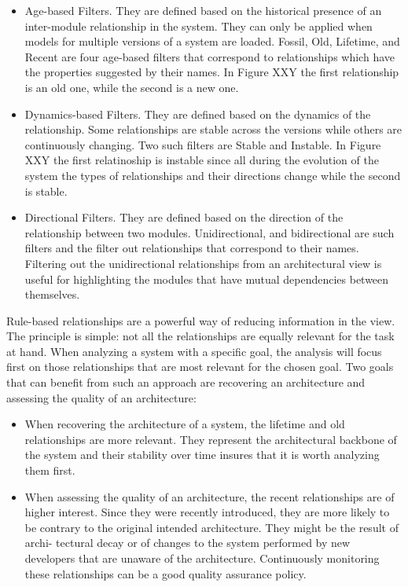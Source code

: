 \documentclass[preprint,12pt]{elsarticle}
\begin{document}
\begin{itemize}
\item Age-based Filters. They are defined based on the historical presence of an inter-module relationship in the system. They can only be applied when models for multiple versions of a system are loaded. Fossil, Old, Lifetime, and Recent are four age-based filters that correspond to relationships which have the properties suggested by their names. In Figure XXY the first relationship is an old one, while the second is a new one. 

\item Dynamics-based Filters. They are defined based on the dynamics of the relationship. Some relationships are stable across the versions while others are continuously changing. Two such filters are Stable and Instable. In Figure XXY the first relatinoship is instable since all during the evolution of the system the types of relationships and their directions change while the second is stable.

\item Directional Filters. They are defined based on the direction of the relationship between two modules. Unidirectional, and bidirectional are such filters and the filter out relationships that correspond to their names. Filtering out the unidirectional relationships from an architectural view is useful for highlighting the modules that have mutual dependencies between themselves. 
\end{itemize}


Rule-based relationships are a powerful way of reducing information in the view. The principle is simple: not all the relationships are equally relevant for the task at hand. When analyzing a system with a specific goal, the analysis will focus first on those relationships that are most relevant for the chosen goal. Two goals that can benefit from such an approach are recovering an architecture and assessing the quality of an architecture:

\begin{itemize}
\item When recovering the architecture of a system, the lifetime and old relationships are more relevant. They represent the architectural backbone of the system and their stability over time insures that it is worth analyzing them first.

\item When assessing the quality of an architecture, the recent relationships are of higher interest. Since they were recently introduced, they are more likely to be contrary to the original intended architecture. They might be the result of archi- tectural decay or of changes to the system performed by new developers that are unaware of the architecture. Continuously monitoring these relationships can be a good quality assurance policy.
\end{itemize}
\end{document}
